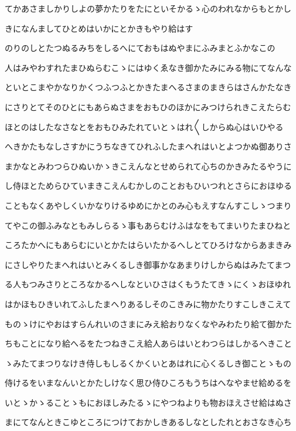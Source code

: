 \documentclass[a4paper,11pt,landscape]{ltjtarticle}
\begin{document}
てかあさましかりしよの夢かたりをたにといそかるゝ心のわれなからもとかし
\par\medskip
きになんましてひとめはいかにとかきもやり給はす
\par\medskip
のりのしとたつぬるみちをしるへにておもはぬやまにふみまとふかなこの
\par\medskip
人はみやわすれたまひぬらむこゝにはゆくゑなき御かたみにみる物にてなんな
\par\medskip
といとこまやかなりかくつふつふとかきたまへるさまのまきらはさんかたなき
\par\medskip
にさりとてそのひとにもあらぬさまをおもひのほかにみつけられきこえたらむ
\par\medskip
ほとのはしたなさなとをおもひみたれていとゝはれ〱しからぬ心はいひやる
\par\medskip
へきかたもなしさすかにうちなきてひれふしたまへれはいとよつかぬ御ありさ
\par\medskip
まかなとみわつらひぬいかゝきこえんなとせめられて心ちのかきみたるやうに
\par\medskip
し侍ほとためらひていまきこえんむかしのことおもひいつれとさらにおほゆる
\par\medskip
こともなくあやしくいかなりけるゆめにかとのみ心もえすなんすこしゝつまり
\par\medskip
てやこの御ふみなともみしらるゝ事もあらむけふはなをもてまいりたまひねと
\par\medskip
ころたかへにもあらむにいとかたはらいたかるへしとてひろけなからあまきみ
\par\medskip
にさしやりたまへれはいとみくるしき御事かなあまりけしからぬはみたてまつ
\par\medskip
る人もつみさりところなかるへしなといひさはくもうたてきゝにくゝおほゆれ
\par\medskip
はかほもひきいれてふしたまへりあるしそのこきみに物かたりすこしきこえて
\par\medskip
ものゝけにやおはすらんれいのさまにみえ給おりなくなやみわたり給て御かた
\par\medskip
ちもことになり給へるをたつねきこえ給人あらはいとわつらはしかるへきこと
\par\medskip
ゝみたてまつりなけき侍しもしるくかくいとあはれに心くるしき御ことゝもの
\par\medskip
侍けるをいまなんいとかたしけなく思ひ侍ひころもうちはへなやませ給めるを
\par\medskip
いとゝかゝることゝもにおほしみたるゝにやつねよりも物おほえさせ給はぬさ
\par\medskip
まにてなんときこゆところにつけておかしきあるしなとしたれとおさなき心ち
\end{document}
